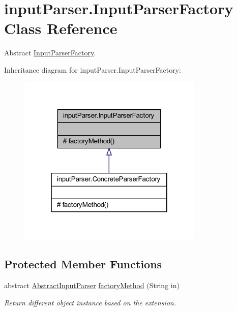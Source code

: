 \hypertarget{classinput_parser_1_1_input_parser_factory}{\section{input\-Parser.\-Input\-Parser\-Factory Class Reference}
\label{classinput_parser_1_1_input_parser_factory}
}


Abstract \hyperlink{classinput_parser_1_1_input_parser_factory}{Input\-Parser\-Factory}.  




Inheritance diagram for input\-Parser.\-Input\-Parser\-Factory\-:\nopagebreak
\begin{figure}[H]
\begin{center}
\leavevmode
\includegraphics[width=250pt]{classinput_parser_1_1_input_parser_factory__inherit__graph}
\end{center}
\end{figure}
\subsection*{Protected Member Functions}
\begin{DoxyCompactItemize}
\item 
abstract \hyperlink{classinput_parser_1_1_abstract_input_parser}{Abstract\-Input\-Parser} \hyperlink{classinput_parser_1_1_input_parser_factory_a48971c2679b589f34a7051e795d48c49}{factory\-Method} (String in)
\begin{DoxyCompactList}\small\item\em Return different object instance based on the extension. \end{DoxyCompactList}\end{DoxyCompactItemize}


